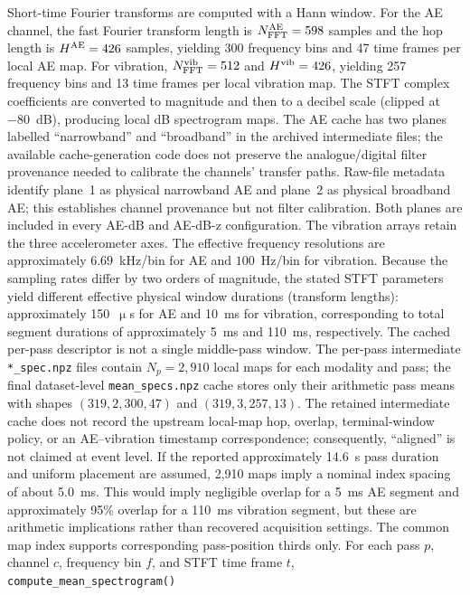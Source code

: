 Short-time Fourier transforms are computed with a Hann window. For the
AE channel, the fast Fourier transform length is $N_{\text{FFT}}^{\rm
AE}=598$ samples and the hop length is $H^{\rm AE}=426$ samples,
yielding 300 frequency bins and 47 time frames per local AE map. For vibration,
$N_{\text{FFT}}^{\rm vib}=512$ and $H^{\rm vib}=426$, yielding 257
frequency bins and 13 time frames per local vibration map. The STFT complex coefficients are converted to magnitude and then to a decibel scale (clipped at $-80$~dB), producing local dB spectrogram maps. The AE cache has two planes labelled ``narrowband'' and ``broadband'' in the archived intermediate files; the available cache-generation code does not preserve the analogue/digital filter provenance needed to calibrate the channels' transfer paths. Raw-file metadata identify plane~1 as physical narrowband AE and plane~2 as physical broadband AE; this establishes channel provenance but not filter calibration. Both planes are included in every AE-dB and AE-dB-z configuration. The vibration arrays retain the three accelerometer axes. The effective frequency resolutions are
approximately $6.69$~kHz/bin for AE and
$100$~Hz/bin for vibration. Because the sampling rates differ by two
orders of magnitude, the stated STFT parameters yield different
effective physical window durations (transform lengths): approximately 150~\(\upmu\)s for AE and
10~ms for vibration, corresponding to total segment durations of approximately 5~ms and 
110~ms, respectively. The cached per-pass descriptor is not a single
middle-pass window. The per-pass intermediate \texttt{*\_spec.npz} files
contain \(N_p=2{,}910\) local maps for each modality and pass; the final
dataset-level \texttt{mean\_specs.npz} cache stores only their arithmetic
pass means with shapes \((319,2,300,47)\) and \((319,3,257,13)\). The retained intermediate cache does not
record the upstream local-map hop, overlap, terminal-window policy, or an
AE--vibration timestamp correspondence; consequently, ``aligned'' is not
claimed at event level. If the reported approximately 14.6~s pass duration
and uniform placement are assumed, 2,910 maps imply a nominal index spacing
of about 5.0~ms. This would imply negligible overlap for a 5~ms AE segment
and approximately 95\% overlap for a 110~ms vibration segment, but these are
arithmetic implications rather than recovered acquisition settings. The
common map index supports corresponding pass-position thirds only. For each pass \(p\), channel \(c\), frequency bin
\(f\), and STFT time frame \(t\), \texttt{compute\_mean\_spectrogram()}
